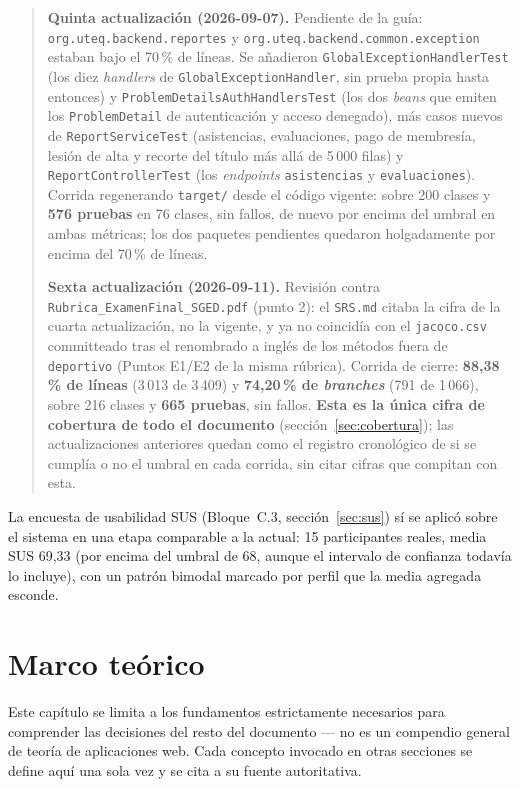 \documentclass[11pt,a4paper]{article}
\begin{document}
\begin{quote}
\textbf{Quinta actualización (2026-09-07).} Pendiente de la guía:
\texttt{org.uteq.backend.reportes} y \texttt{org.uteq.backend.common.exception}
estaban bajo el 70\,\% de líneas. Se añadieron \texttt{GlobalExceptionHandlerTest}
(los diez \emph{handlers} de \texttt{GlobalExceptionHandler}, sin prueba
propia hasta entonces) y \texttt{ProblemDetailsAuthHandlersTest} (los dos
\emph{beans} que emiten los \texttt{ProblemDetail} de autenticación y
acceso denegado), más casos nuevos de \texttt{ReportServiceTest}
(asistencias, evaluaciones, pago de membresía, lesión de alta y recorte
del título más allá de 5\,000 filas) y \texttt{ReportControllerTest} (los
\emph{endpoints} \texttt{asistencias} y \texttt{evaluaciones}). Corrida
regenerando \texttt{target/} desde el código vigente: sobre 200 clases y
\textbf{576 pruebas} en 76 clases, sin fallos, de nuevo por encima del
umbral en ambas métricas; los dos paquetes pendientes quedaron
holgadamente por encima del 70\,\% de líneas.

\textbf{Sexta actualización (2026-09-11).} Revisión contra
\texttt{Rubrica\_ExamenFinal\_SGED.pdf} (punto 2): el \texttt{SRS.md}
citaba la cifra de la cuarta actualización, no la vigente, y ya no
coincidía con el \texttt{jacoco.csv} committeado tras el renombrado a
inglés de los métodos fuera de \texttt{deportivo} (Puntos E1/E2 de la
misma rúbrica). Corrida de cierre:
\textbf{88,38\,\% de líneas} (3\,013 de 3\,409) y \textbf{74,20\,\% de
\emph{branches}} (791 de 1\,066), sobre 216 clases y \textbf{665 pruebas},
sin fallos. \textbf{Esta es la única cifra de cobertura de todo el
documento} (sección~\ref{sec:cobertura}); las actualizaciones anteriores
quedan como el registro cronológico de si se cumplía o no el umbral en
cada corrida, sin citar cifras que compitan con esta.
\end{quote}

La encuesta de usabilidad SUS (Bloque~C.3, sección~\ref{sec:sus}) sí se
aplicó sobre el sistema en una etapa comparable a la actual: 15
participantes reales, media SUS 69,33 (por encima del umbral de 68,
aunque el intervalo de confianza todavía lo incluye), con un patrón
bimodal marcado por perfil que la media agregada esconde.

\section{Marco teórico}
\label{sec:marco-teorico}

Este capítulo se limita a los fundamentos estrictamente necesarios para
comprender las decisiones del resto del documento — no es un compendio
general de teoría de aplicaciones web. Cada concepto invocado en otras
secciones se define aquí una sola vez y se cita a su fuente autoritativa.
\end{document}
